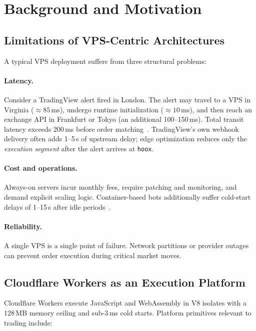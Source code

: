 \section{Background and Motivation}
\label{sec:background}

\subsection{Limitations of VPS-Centric Architectures}

A typical VPS deployment suffers from three structural problems:

\paragraph{Latency.} Consider a TradingView alert fired in London. The alert may travel to a VPS in Virginia (${\approx}85$\,ms), undergo runtime initialization (${\approx}10$\,ms), and then reach an exchange API in Frankfurt or Tokyo (an additional 100--150\,ms). Total transit latency exceeds 200\,ms before order matching~\cite{hasbrouck2007empirical}. TradingView's own webhook delivery often adds 1--5\,s of upstream delay; edge optimization reduces only the \emph{execution segment} after the alert arrives at \texttt{hoox}.

\paragraph{Cost and operations.} Always-on servers incur monthly fees, require patching and monitoring, and demand explicit scaling logic. Container-based bots additionally suffer cold-start delays of 1--15\,s after idle periods~\cite{wang2018peeking,lloyd2018serverless}.

\paragraph{Reliability.} A single VPS is a single point of failure. Network partitions or provider outages can prevent order execution during critical market moves.

\subsection{Cloudflare Workers as an Execution Platform}

Cloudflare Workers execute JavaScript and WebAssembly in V8 isolates with a 128\,MB memory ceiling and sub-3\,ms cold starts. Platform primitives relevant to trading include:

